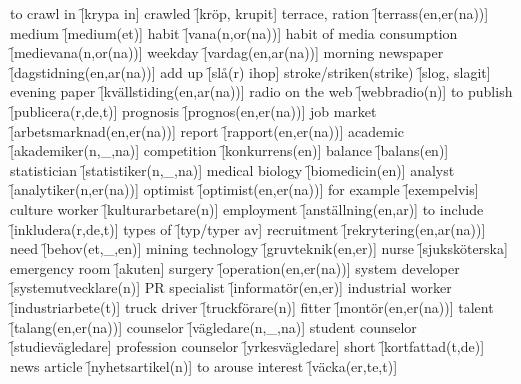 \begin{questions}
\begin{multicols}{2}
        \question to crawl in \f[krypa in]
        \question crawled \f[kröp, krupit]
        \question terrace, ration \f[terrass(en,er(na))]
        \question medium \f[medium(et)]
        \question habit \f[vana(n,or(na))]
        \question habit of media consumption \f[medievana(n,or(na))]
        \question weekday \f[vardag(en,ar(na))]
        \question morning newspaper \f[dagstidning(en,ar(na))]
        \question add up \f[slå(r) ihop]
        \question stroke/striken(strike) \f[slog, slagit]
        \question evening paper \f[kvällstiding(en,ar(na))]
        \question radio on the web \f[webbradio(n)]
        \question to publish \f[publicera(r,de,t)]
        \question prognosis \f[prognos(en,er(na))]
        \question job market \f[arbetsmarknad(en,er(na))]
        \question report \f[rapport(en,er(na))]
        \question academic \f[akademiker(n,\_,na)]
        \question competition \f[konkurrens(en)]
        \question balance \f[balans(en)]
        \question statistician \f[statistiker(n,\_,na)]
        \question medical biology \f[biomedicin(en)]
        \question analyst \f[analytiker(n,er(na))]
        \question optimist \f[optimist(en,er(na))]
        \question for example \f[exempelvis]
        \question culture worker \f[kulturarbetare(n)]
        \question employment \f[anställning(en,ar)]
        \question to include \f[inkludera(r,de,t)]
        \question types of \f[typ/typer av]
        \question recruitment \f[rekrytering(en,ar(na))]
        \question need \f[behov(et,\_,en)]
        \question mining technology \f[gruvteknik(en,er)]
        \question nurse \f[sjuksköterska]
        \question emergency room \f[akuten]
        \question surgery \f[operation(en,er(na))]
        \question system developer \f[systemutvecklare(n)]
        \question PR specialist \f[informatör(en,er)]
        \question industrial worker \f[industriarbete(t)]
        \question truck driver \f[truckförare(n)]
        \question fitter \f[montör(en,er(na))]
        \question talent \f[talang(en,er(na))]
        \question counselor \f[vägledare(n,\_,na)]
        \question student counselor \f[studievägledare]
        \question profession counselor \f[yrkesvägledare]
        \question short \f[kortfattad(t,de)]
        \question news article \f[nyhetsartikel(n)]
        \question to arouse interest \f[väcka(er,te,t)]
    \end{multicols}
\end{questions}
